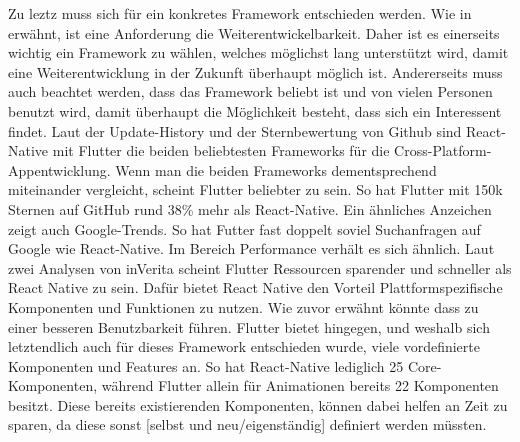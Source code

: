 \myNewSection
Zu leztz muss sich für ein konkretes Framework entschieden werden. %
	Wie in  erwähnt, ist eine Anforderung die Weiterentwickelbarkeit. Daher ist es einerseits wichtig ein Framework zu wählen, welches möglichst lang unterstützt wird, damit eine Weiterentwicklung in der Zukunft überhaupt möglich ist.\newline%
	Andererseits muss auch beachtet werden, dass das Framework beliebt ist und von vielen Personen benutzt wird, damit überhaupt die Möglichkeit besteht, dass sich ein Interessent findet.\newline%
	Laut der Update-History und der Sternbewertung von Github sind React-Native mit Flutter die beiden beliebtesten Frameworks für die Cross-Platform-Appentwicklung\cite{tech_flutterStars, tech_reactNativStars}.\newline%
Wenn man die beiden Frameworks dementsprechend miteinander vergleicht, scheint Flutter beliebter zu sein. So hat Flutter mit 150k Sternen auf GitHub rund 38\% mehr als React-Native\cite{tech_flutterStars, tech_reactNativStars}. Ein ähnliches Anzeichen zeigt auch Google-Trends. So hat Futter fast doppelt soviel Suchanfragen auf Google wie React-Native\cite{tech_googleTrendsFlutterVsReactNative}.\newline%
Im Bereich Performance verhält es sich ähnlich. Laut zwei Analysen von inVerita scheint Flutter Ressourcen sparender und schneller als React Native zu sein\cite{tech_performanceReactNativeVsFlutter1, tech_performanceReactNativeVsFlutter2}.\newline%
Dafür bietet React Native den Vorteil Plattformspezifische Komponenten und Funktionen zu nutzen. Wie zuvor erwähnt könnte dass zu einer besseren Benutzbarkeit führen.\newline%
Flutter bietet hingegen, und weshalb sich letztendlich auch für dieses Framework entschieden wurde, viele vordefinierte Komponenten und Features an. So hat React-Native lediglich 25 Core-Komponenten, während Flutter allein für Animationen bereits 22 Komponenten besitzt\cite{tech_componentsFlutter, tech_componentsReactNative}. Diese bereits existierenden Komponenten, können dabei helfen an Zeit zu sparen, da diese sonst [selbst und neu/eigenständig] definiert werden müssten.%